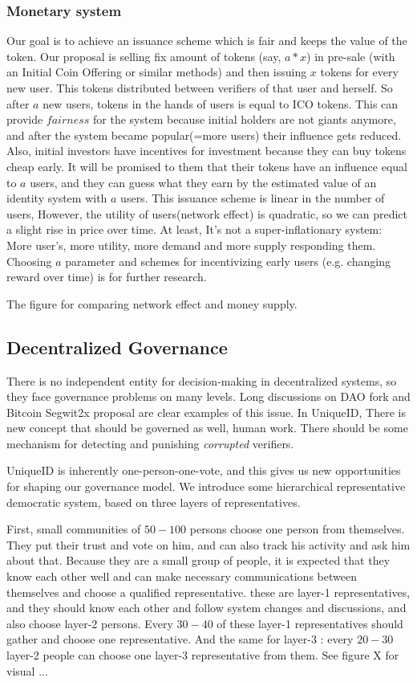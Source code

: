 \documentclass[conference]{IEEEtran}
\begin{document}
\subsubsection{Monetary system}
Our goal is to achieve an issuance scheme which is fair and keeps the value of the token. Our proposal is selling fix amount of tokens (say, $a*x$) in pre-sale (with an Initial Coin Offering or similar methods) and then issuing $x$ tokens for every new user. This tokens distributed between verifiers of that user and herself. So after $a$ new users, tokens in the hands of users is equal to ICO tokens. This can provide $fairness$ for the system because initial holders are not giants anymore, and after the system became popular(=more users) their influence gets reduced. Also, initial investors have incentives for investment because they can buy tokens cheap early. It will be promised to them that their tokens have an influence equal to $a$ users, and they can guess what they earn by the estimated value of an identity system with $a$ users. This issuance scheme is linear in the number of users, However, the utility of users(network effect) is quadratic, so we can predict a slight rise in price over time. At least, It's not a super-inflationary system: More user's, more utility, more demand and more supply responding them. Choosing $a$ parameter and schemes for incentivizing early users (e.g. changing reward over time) is for further research.




The figure for comparing network effect and money supply.

\subsection{Decentralized Governance}
There is no independent entity for decision-making in decentralized systems, so they face governance problems on many levels. Long discussions on  DAO fork and Bitcoin Segwit2x proposal are clear examples of this issue. In UniqueID, There is new concept that should be governed as well, human work. There should be some mechanism for detecting and punishing \textit{corrupted} verifiers.


UniqueID is inherently one-person-one-vote, and this gives us new opportunities for shaping our governance model. We introduce some hierarchical representative democratic system, based on three layers of representatives. 


First, small communities of $50-100$ persons choose one person from themselves. They put their trust and vote on him, and can also track his activity and ask him about that. Because they are a small group of people, it is expected that they know each other well and can make necessary communications between themselves and choose a qualified representative. these are layer-1 representatives, and they should know each other and follow system changes and discussions, and also choose layer-2 persons. Every $30-40$ of these layer-1 representatives should gather and choose one representative. And the same for layer-3 : every $20-30$ layer-2 people can choose one layer-3 representative from them. See figure X for visual ...
\end{document}
